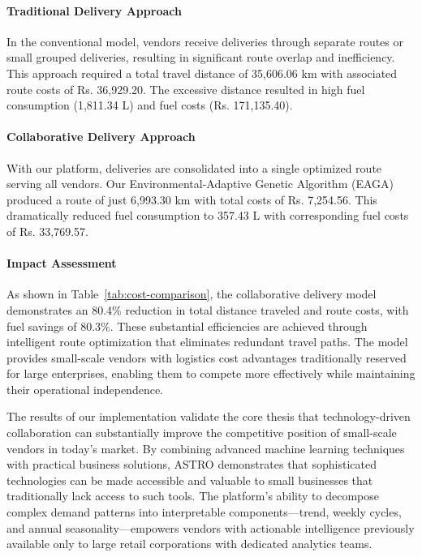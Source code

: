 \paragraph{Traditional Delivery Approach} In the conventional model, vendors receive deliveries through separate routes or small grouped deliveries, resulting in significant route overlap and inefficiency. This approach required a total travel distance of 35,606.06 km with associated route costs of Rs. 36,929.20. The excessive distance resulted in high fuel consumption (1,811.34 L) and fuel costs (Rs. 171,135.40).

\paragraph{Collaborative Delivery Approach} With our platform, deliveries are consolidated into a single optimized route serving all vendors. Our Environmental-Adaptive Genetic Algorithm (EAGA) produced a route of just 6,993.30 km with total costs of Rs. 7,254.56. This dramatically reduced fuel consumption to 357.43 L with corresponding fuel costs of Rs. 33,769.57.

\paragraph{Impact Assessment} As shown in Table~\ref{tab:cost-comparison}, the collaborative delivery model demonstrates an 80.4\% reduction in total distance traveled and route costs, with fuel savings of 80.3\%. These substantial efficiencies are achieved through intelligent route optimization that eliminates redundant travel paths. The model provides small-scale vendors with logistics cost advantages traditionally reserved for large enterprises, enabling them to compete more effectively while maintaining their operational independence.

\par The results of our implementation validate the core thesis that technology-driven collaboration can substantially improve the competitive position of small-scale vendors in today's market. By combining advanced machine learning techniques with practical business solutions, ASTRO demonstrates that sophisticated technologies can be made accessible and valuable to small businesses that traditionally lack access to such tools. The platform's ability to decompose complex demand patterns into interpretable components—trend, weekly cycles, and annual seasonality—empowers vendors with actionable intelligence previously available only to large retail corporations with dedicated analytics teams.

